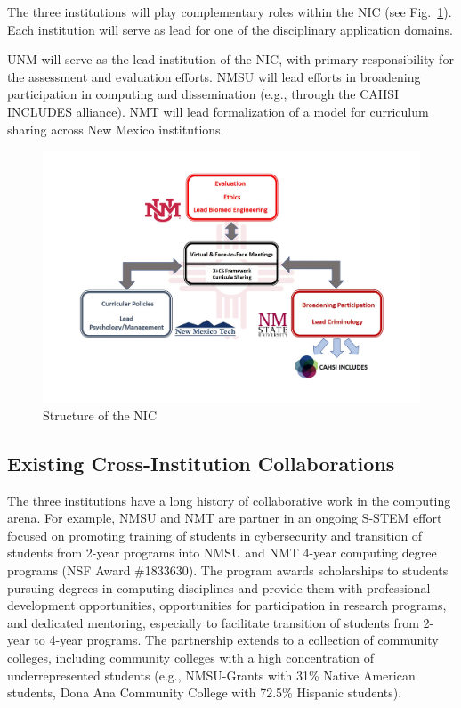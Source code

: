 The three institutions will play complementary roles within the NIC (see Fig.~\ref{nic}). Each institution will serve as lead for one of the disciplinary application domains.

UNM will serve as the lead institution of the NIC, with primary responsibility for the assessment and evaluation efforts.
NMSU will lead efforts in broadening participation in computing and dissemination (e.g., through the CAHSI INCLUDES alliance).
NMT will lead formalization of a model for curriculum sharing across New Mexico institutions. 


\begin{figure}[htbp]
\centerline{\includegraphics[width=.8\textwidth]{nic.pdf}}
\caption{Structure of the NIC}
\label{nic}
\end{figure}

 


\subsection{Existing Cross-Institution Collaborations}
The three institutions have a long history of collaborative work in the computing arena. For example, NMSU and NMT are partner in an ongoing S-STEM effort focused on promoting training of students in cybersecurity and transition of students from 2-year programs into NMSU and NMT 4-year computing degree programs (NSF Award \#1833630). The program awards scholarships to students pursuing degrees in computing disciplines and provide them with professional development opportunities, opportunities for participation in research programs, and dedicated mentoring, especially to facilitate transition of students from 2-year to 4-year programs. The partnership extends to a collection of community colleges, including community colleges with a high concentration of underrepresented students (e.g., NMSU-Grants with 31\% Native American students, Dona Ana Community College with 72.5\% Hispanic students).

